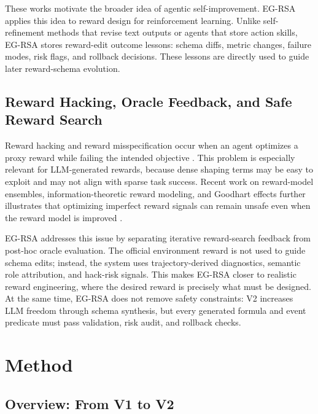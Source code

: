 \documentclass[11pt]{article}
\begin{document}
These works motivate the broader idea of agentic self-improvement. EG-RSA applies this idea to reward design for reinforcement learning. Unlike self-refinement methods that revise text outputs or agents that store action skills, EG-RSA stores reward-edit outcome lessons: schema diffs, metric changes, failure modes, risk flags, and rollback decisions. These lessons are directly used to guide later reward-schema evolution.

\subsection{Reward Hacking, Oracle Feedback, and Safe Reward Search}

Reward hacking and reward misspecification occur when an agent optimizes a proxy reward while failing the intended objective \citep{amodei2016concrete,pan2022effects,skalse2022reward}. This problem is especially relevant for LLM-generated rewards, because dense shaping terms may be easy to exploit and may not align with sparse task success. Recent work on reward-model ensembles, information-theoretic reward modeling, and Goodhart effects further illustrates that optimizing imperfect reward signals can remain unsafe even when the reward model is improved \citep{eisenstein2023ensembles,langosco2024goodhart}.

EG-RSA addresses this issue by separating iterative reward-search feedback from post-hoc oracle evaluation. The official environment reward is not used to guide schema edits; instead, the system uses trajectory-derived diagnostics, semantic role attribution, and hack-risk signals. This makes EG-RSA closer to realistic reward engineering, where the desired reward is precisely what must be designed. At the same time, EG-RSA does not remove safety constraints: V2 increases LLM freedom through schema synthesis, but every generated formula and event predicate must pass validation, risk audit, and rollback checks.

\section{Method}
\label{sec:method}

\subsection{Overview: From V1 to V2}
\end{document}
